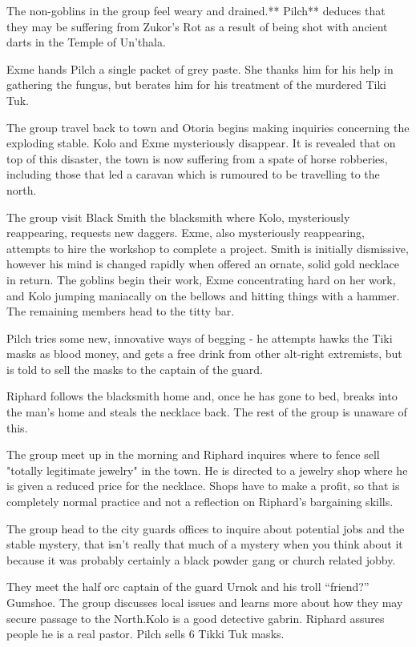 \documentclass[letterpaper,10pt,twoside,twocolumn,openany]{book}
\begin{document}
The non-goblins in the group feel weary and drained.** Pilch** deduces that they may be suffering from Zukor’s Rot as a result of being shot with ancient darts in the Temple of Un'thala.

Exme hands Pilch a single packet of grey paste. She thanks him for his help in gathering the fungus, but berates him for his treatment of the murdered Tiki Tuk.

The group travel back to town and Otoria begins making inquiries concerning the exploding stable. Kolo and Exme mysteriously disappear. It is revealed that on top of this disaster, the town is now suffering from a spate of horse robberies, including those that led a caravan which is rumoured to be travelling to the north.

The group visit Black Smith the blacksmith where Kolo, mysteriously reappearing, requests new daggers. Exme, also mysteriously reappearing, attempts to hire the workshop to complete a project. Smith is initially dismissive, however his mind is changed rapidly when offered an ornate, solid gold necklace in return. The goblins begin their work, Exme concentrating hard on her work, and Kolo jumping maniacally on the bellows and hitting things with a hammer. The remaining members head to the titty bar.

Pilch tries some new, innovative ways of begging - he attempts hawks the Tiki masks as blood money, and gets a free drink from other alt-right extremists, but is told to sell the masks to the captain of the guard.

Riphard follows the blacksmith home and, once he has gone to bed, breaks into the man’s home and steals the necklace back. The rest of the group is unaware of this.

The group meet up in the morning and Riphard inquires where to fence sell "totally legitimate jewelry" in the town. He is directed to a jewelry shop where he is given a reduced price for the necklace. Shops have to make a profit, so that is completely normal practice and not a reflection on Riphard's bargaining skills.

The group head to the city guards offices to inquire about potential jobs and the stable mystery, that isn’t really that much of a mystery when you think about it because it was probably certainly a black powder gang or church related jobby.

They meet the half orc captain of the guard Urnok and his troll “friend?” Gumshoe. The group discusses local issues and learns more about how they may secure passage to the North.Kolo is a good detective gabrin. Riphard assures people he is a real pastor. Pilch sells 6 Tikki Tuk masks.
\end{document}
